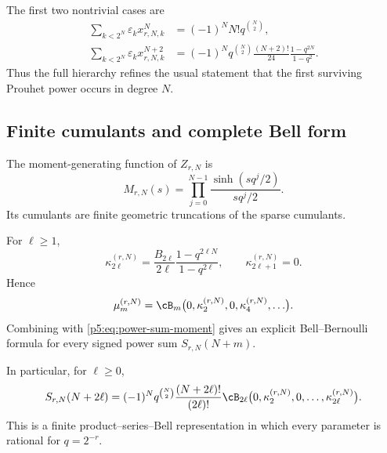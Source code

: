 \documentclass[11pt]{article}
\theoremstyle{definition}
\theoremstyle{remark}
\newcommand{\eps}{\varepsilon}
\begin{document}
The first two nontrivial cases are
\begin{align}
 \sum_{k<2^N}\eps_kx_{r,N,k}^{N}
 &=(-1)^NN!q^{\binom N2},                                 \label{p5:eq:first-survivor}\\
 \sum_{k<2^N}\eps_kx_{r,N,k}^{N+2}
 &=(-1)^Nq^{\binom N2}\frac{(N+2)!}{24}
   \frac{1-q^{2N}}{1-q^2}.                                \label{p5:eq:second-survivor}
\end{align}
Thus the full hierarchy refines the usual statement that the first surviving
Prouhet power occurs in degree $N$.

\subsection{Finite cumulants and complete Bell form}

The moment-generating function of $Z_{r,N}$ is
\begin{equation}
 M_{r,N}(s)=\prod_{j=0}^{N-1}\frac{\sinh(sq^j/2)}{sq^j/2}. \label{p5:eq:MrN}
\end{equation}
Its cumulants are finite geometric truncations of the sparse cumulants.

\begin{proposition}
\label{p5:prop:finite-sparse-cumulants}
For $\ell\ge1$,
\begin{equation}
 \kappa_{2\ell}^{(r,N)}
 =\frac{B_{2\ell}}{2\ell}
   \frac{1-q^{2\ell N}}{1-q^{2\ell}},
 \qquad
 \kappa_{2\ell+1}^{(r,N)}=0.                              \label{p5:eq:finite-cumulants}
\end{equation}
Hence
\begin{equation}
 \mu_m^{(r,N)}
 =\cB_m\bigl(0,\kappa_2^{(r,N)},0,\kappa_4^{(r,N)},\ldots\bigr). \label{p5:eq:finite-Bell-moments}
\end{equation}
Combining with \eqref{p5:eq:power-sum-moment} gives an explicit
Bell--Bernoulli formula for every signed power sum $S_{r,N}(N+m)$.
\end{proposition}

In particular, for $\ell\ge0$,
\begin{equation}
 S_{r,N}(N+2\ell)
 =(-1)^Nq^{\binom N2}\frac{(N+2\ell)!}{(2\ell)!}
 \cB_{2\ell}\bigl(0,\kappa_2^{(r,N)},0,\ldots,
                    \kappa_{2\ell}^{(r,N)}\bigr).          \label{p5:eq:Bell-power-sum}
\end{equation}
This is a finite product--series--Bell representation in which every parameter
is rational for $q=2^{-r}$.
\end{document}
